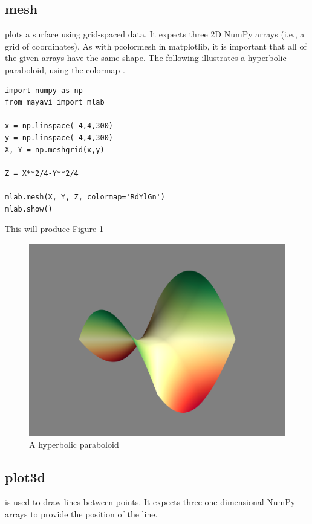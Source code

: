 \subsection*{mesh}
 plots a surface using grid-spaced data.
It expects three 2D NumPy arrays (i.e., a grid of  coordinates).
As with pcolormesh in matplotlib, it is important that all of the given arrays have the same shape.
The following illustrates a hyperbolic paraboloid, using the colormap .
\begin{lstlisting}
import numpy as np
from mayavi import mlab

x = np.linspace(-4,4,300)
y = np.linspace(-4,4,300)
X, Y = np.meshgrid(x,y)

Z = X**2/4-Y**2/4

mlab.mesh(X, Y, Z, colormap='RdYlGn')
mlab.show()
\end{lstlisting}

This will produce Figure \ref{fig:mesh_example}
\begin{figure}
\includegraphics[width=\textwidth]{mesh_example.png}
\caption{A hyperbolic paraboloid}
\label{fig:mesh_example}
\end{figure}

\subsection*{plot3d}
 is used to draw lines between points.
It expects three one-dimensional NumPy arrays to provide the position of the line.


